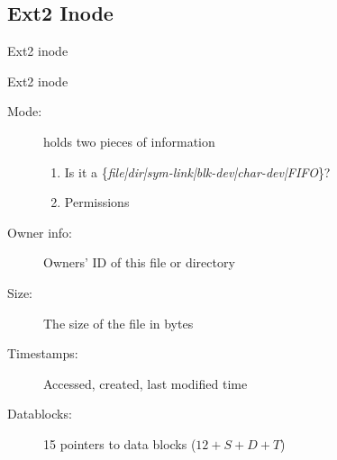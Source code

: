 \subsection{Ext2 Inode}

\begin{frame}{Ext2 inode}
  \begin{center}
  \end{center}
\end{frame}

\begin{frame}
  \begin{block}{Ext2 inode}
    \begin{description}
    \item[Mode:] holds two pieces of information
      \begin{enumerate}
      \item Is it a \mbox{\{\emph{file|dir|sym-link|blk-dev|char-dev|FIFO}\}}?
      \item Permissions
      \end{enumerate}
    \item[Owner info:] Owners' ID of this file or directory
    \item[Size:] The size of the file in bytes
    \item[Timestamps:] Accessed, created, last modified time
    \item[Datablocks:] 15 pointers to data blocks ($12+S+D+T$)
    \end{description}
  \end{block}
\end{frame}

